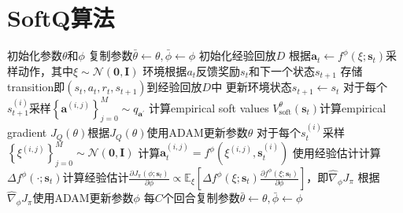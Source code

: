 \documentclass[11pt]{ctexart}
\begin{document}
\section{SoftQ算法}
\begin{algorithm}[H]
    \renewcommand{\thealgorithm}{} %
	\caption{}  
	\begin{algorithmic}[1]
		\STATE 初始化参数$\theta$和$\phi$%
		\STATE 复制参数$\bar{\theta} \leftarrow \theta, \bar{\phi} \leftarrow \phi$
		\STATE 初始化经验回放$D$
				\STATE 根据$\mathbf{a}_{t} \leftarrow f^{\phi}\left(\xi ; \mathbf{s}_{t}\right)$采样动作，其中$\xi \sim \mathcal{N}(\mathbf{0}, \boldsymbol{I})$
				\STATE 环境根据$a_t$反馈奖励$s_t$和下一个状态$s_{t+1}$
				\STATE 存储transition即$(s_t,a_t,r_t,s_{t+1})$到经验回放$D$中
				\STATE 更新环境状态$s_{t+1} \leftarrow s_t$
				\STATE 对于每个$s^{(i)}_{t+1}$采样$\left\{\mathbf{a}^{(i, j)}\right\}_{j=0}^{M} \sim q_{\mathbf{a}^{\prime}}$
				\STATE 计算empirical soft values $V_{\mathrm{soft}}^{\theta}\left(\mathbf{s}_{t}\right)$\footnotemark[1]
				\STATE 计算empirical gradient $J_{Q}(\theta)$\footnotemark[2]
				\STATE 根据$J_{Q}(\theta)$使用ADAM更新参数$\theta$
				\STATE  对于每个$s^{(i)}_{t}$采样$\left\{\xi^{(i, j)}\right\}_{j=0}^{M} \sim \mathcal{N}(\mathbf{0}, \boldsymbol{I})$
				\STATE 计算$\mathbf{a}_{t}^{(i, j)}=f^{\phi}\left(\xi^{(i, j)}, \mathbf{s}_{t}^{(i)}\right)$
				\STATE 使用经验估计计算$\Delta f^{\phi}\left(\cdot ; \mathbf{s}_{t}\right)$\footnotemark[3]
				\STATE 计算经验估计$\frac{\partial J_{\pi}\left(\phi ; \mathbf{s}_{t}\right)}{\partial \phi} \propto \mathbb{E}_{\xi}\left[\Delta f^{\phi}\left(\xi ; \mathbf{s}_{t}\right) \frac{\partial f^{\phi}\left(\xi ; \mathbf{s}_{t}\right)}{\partial \phi}\right]$，即$\hat{\nabla}_{\phi} J_{\pi}$
				\STATE 根据$\hat{\nabla}_{\phi} J_{\pi}$使用ADAM更新参数$\phi$
				\STATE 
			\ENDFOR
			\STATE 每$C$个回合复制参数$\bar{\theta} \leftarrow \theta, \bar{\phi} \leftarrow \phi$
		\ENDFOR	
	\end{algorithmic}
\end{algorithm}
\end{document}
